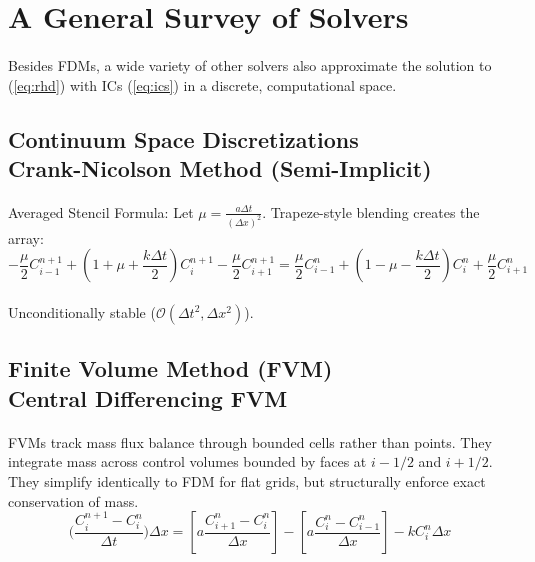 \section{A General Survey of Solvers}
\paragraph{}
Besides FDMs, a wide variety of other solvers also approximate the solution to (\ref{eq:rhd}) with ICs (\ref{eq:ics}) in a discrete, computational space.

\subsection*{Continuum Space Discretizations\\ \normalsize Crank-Nicolson Method (Semi-Implicit)}
\paragraph{}
Averaged Stencil Formula: Let $\mu = \frac{a \Delta t}{(\Delta x)^2}$. Trapeze-style blending creates the array:
\begin{equation*}
-\frac{\mu}{2} C_{i-1}^{n+1} + \left(1 + \mu + \frac{k\Delta t}{2}\right) C_i^{n+1} - \frac{\mu}{2} C_{i+1}^{n+1} = \frac{\mu}{2} C_{i-1}^n + \left(1 - \mu - \frac{k\Delta t}{2}\right) C_i^n + \frac{\mu}{2} C_{i+1}^n
\end{equation*}
\paragraph{}
Unconditionally stable ($\mathcal{O}(\Delta t^2, \Delta x^2)$).

\subsection*{Finite Volume Method (FVM) \\ \normalsize Central Differencing FVM}
\paragraph{}
FVMs track mass flux balance through bounded cells rather than points. They integrate mass across control volumes bounded by faces at $i-1/2$ and $i+1/2$. They simplify identically to FDM for flat grids, but structurally enforce exact conservation of mass.
\begin{equation*}
\big( \frac{C_i^{n+1} - C_i^n}{\Delta t} \big) \Delta x = \left[ a \frac{C_{i+1}^n - C_i^n}{\Delta x} \right] - \left[ a \frac{C_i^n - C_{i-1}^n}{\Delta x} \right] - k C_i^n \Delta x
\end{equation*}

